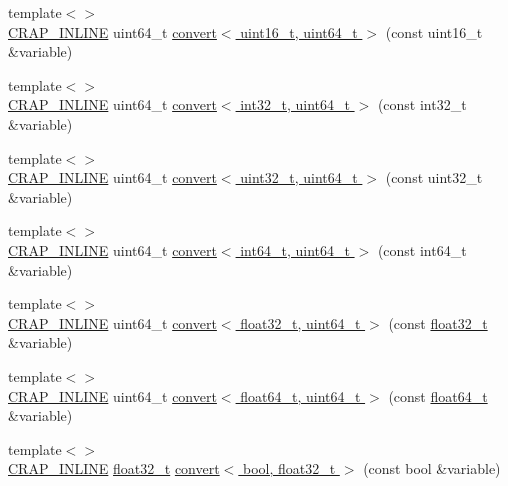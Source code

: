 \begin{DoxyCompactItemize}
\item 
{\footnotesize template$<$$>$ }\\\hyperlink{config__x86_8h_a5a40526b8d842e7ff731509998bb0f1c}{C\+R\+A\+P\+\_\+\+I\+N\+L\+I\+N\+E} uint64\+\_\+t \hyperlink{namespacecrap_ac86b6880286c44599dc238311bba0f27}{convert$<$ uint16\+\_\+t, uint64\+\_\+t $>$} (const uint16\+\_\+t \&variable)
\item 
{\footnotesize template$<$$>$ }\\\hyperlink{config__x86_8h_a5a40526b8d842e7ff731509998bb0f1c}{C\+R\+A\+P\+\_\+\+I\+N\+L\+I\+N\+E} uint64\+\_\+t \hyperlink{namespacecrap_ae5a000fbf6ef354df50291eebcb81fde}{convert$<$ int32\+\_\+t, uint64\+\_\+t $>$} (const int32\+\_\+t \&variable)
\item 
{\footnotesize template$<$$>$ }\\\hyperlink{config__x86_8h_a5a40526b8d842e7ff731509998bb0f1c}{C\+R\+A\+P\+\_\+\+I\+N\+L\+I\+N\+E} uint64\+\_\+t \hyperlink{namespacecrap_a1169116332f7e11d162092a4a2653896}{convert$<$ uint32\+\_\+t, uint64\+\_\+t $>$} (const uint32\+\_\+t \&variable)
\item 
{\footnotesize template$<$$>$ }\\\hyperlink{config__x86_8h_a5a40526b8d842e7ff731509998bb0f1c}{C\+R\+A\+P\+\_\+\+I\+N\+L\+I\+N\+E} uint64\+\_\+t \hyperlink{namespacecrap_a973f7aa1b473575f267478943bb42c23}{convert$<$ int64\+\_\+t, uint64\+\_\+t $>$} (const int64\+\_\+t \&variable)
\item 
{\footnotesize template$<$$>$ }\\\hyperlink{config__x86_8h_a5a40526b8d842e7ff731509998bb0f1c}{C\+R\+A\+P\+\_\+\+I\+N\+L\+I\+N\+E} uint64\+\_\+t \hyperlink{namespacecrap_a9b854f0f9088467eff717004d4e6ff48}{convert$<$ float32\+\_\+t, uint64\+\_\+t $>$} (const \hyperlink{crap__types_8h_a4611b605e45ab401f02cab15c5e38715}{float32\+\_\+t} \&variable)
\item 
{\footnotesize template$<$$>$ }\\\hyperlink{config__x86_8h_a5a40526b8d842e7ff731509998bb0f1c}{C\+R\+A\+P\+\_\+\+I\+N\+L\+I\+N\+E} uint64\+\_\+t \hyperlink{namespacecrap_a718b8ddc03963722aa2a0dabd8eb2f6c}{convert$<$ float64\+\_\+t, uint64\+\_\+t $>$} (const \hyperlink{crap__types_8h_ac55f3ae81b5bc9053760baacf57e47f4}{float64\+\_\+t} \&variable)
\item 
{\footnotesize template$<$$>$ }\\\hyperlink{config__x86_8h_a5a40526b8d842e7ff731509998bb0f1c}{C\+R\+A\+P\+\_\+\+I\+N\+L\+I\+N\+E} \hyperlink{crap__types_8h_a4611b605e45ab401f02cab15c5e38715}{float32\+\_\+t} \hyperlink{namespacecrap_a916efee36ef25d553267832539a327a8}{convert$<$ bool, float32\+\_\+t $>$} (const bool \&variable)

\end{DoxyCompactItemize}
